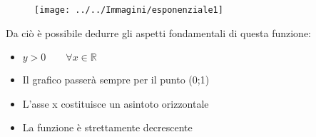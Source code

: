 \documentclass[10pt, a4paper]{article}
\theoremstyle{remark}
\begin{document}
\begin{figure}[th]
	\centering
	\texttt{[image: ../../Immagini/esponenziale1]}
	\caption*{}
	\label{fig:esponenziale1}
\end{figure}

Da ciò è possibile dedurre gli aspetti fondamentali di questa funzione:

\begin{itemize}
	\item $y>0 \qquad \forall x \in \mathbb{R}$
	\item Il grafico passerà sempre per il punto (0;1)
	\item L'asse x costituisce un asintoto orizzontale
	\item La funzione è strettamente decrescente
\end{itemize}
\end{document}

